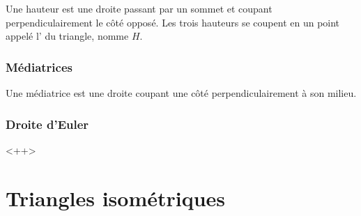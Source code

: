\begin{multicols}{2}
    Une hauteur est une droite passant par un sommet et coupant perpendiculairement le côté opposé. Les trois hauteurs se coupent en un point appelé l' du triangle, nomme \( H\).

    \columnbreak




\end{multicols}


\subsubsection{Médiatrices}

\begin{multicols}{2}
    Une médiatrice est une droite coupant une côté perpendiculairement à son milieu.

    \columnbreak



\end{multicols}

\subsubsection{Droite d'Euler}

<++>


\section{Triangles isométriques}

